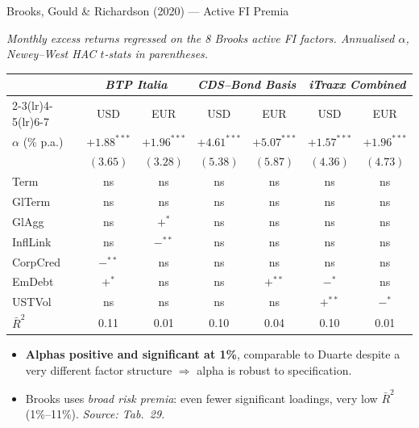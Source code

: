 \documentclass[aspectratio=169,11pt]{beamer}
\newcommand{\hlt}[1]{\textcolor{edhecred}{\textbf{#1}}}     %
\begin{document}
\begin{frame}[t]{Brooks, Gould \& Richardson (2020) --- Active FI Premia}
\centering
\scriptsize
\vspace{0.05cm}

\textit{Monthly excess returns regressed on the 8 Brooks active FI factors.
Annualised $\alpha$, Newey--West HAC $t$-stats in parentheses.}

\vspace{0.20cm}
\renewcommand{\arraystretch}{0.95}
\setlength{\tabcolsep}{4pt}

\begin{tabular}{lcccccc}
\toprule
 & \multicolumn{2}{c}{\textit{BTP Italia}}
 & \multicolumn{2}{c}{\textit{CDS--Bond Basis}}
 & \multicolumn{2}{c}{\textit{iTraxx Combined}} \\
\cmidrule(lr){2-3}\cmidrule(lr){4-5}\cmidrule(lr){6-7}
 & USD & EUR & USD & EUR & USD & EUR \\
\midrule
$\alpha$ (\% p.a.)  & \hlt{$+1.88^{***}$} & \hlt{$+1.96^{***}$}
                    & \hlt{$+4.61^{***}$} & \hlt{$+5.07^{***}$}
                    & \hlt{$+1.57^{***}$} & \hlt{$+1.96^{***}$} \\
                    & $(3.65)$ & $(3.28)$ & $(5.38)$ & $(5.87)$ & $(4.36)$ & $(4.73)$ \\
\addlinespace
Term       & ns  & ns  & ns  & ns  & ns  & ns  \\
GlTerm     & ns  & ns  & ns  & ns  & ns  & ns  \\
GlAgg      & ns  & $+^{*}$ & ns & ns & ns & ns \\
InflLink   & ns  & $-^{**}$ & ns  & ns  & ns  & ns  \\
CorpCred   & $-^{**}$ & ns & ns & ns  & ns  & ns  \\
EmDebt     & $+^{*}$ & ns & ns & $+^{**}$ & $-^{*}$ & ns \\
USTVol     & ns  & ns  & ns  & ns  & $+^{**}$ & $-^{*}$ \\
\addlinespace
$\bar R^2$ & 0.11 & 0.01 & 0.10 & 0.04 & 0.10 & 0.01 \\
\bottomrule
\end{tabular}

\vspace{0.25cm}

\begin{itemize}\itemsep=0.04cm\scriptsize
  \item \hlt{Alphas positive and significant at 1\%}, comparable to Duarte despite a
        very different factor structure $\Rightarrow$ alpha is robust to specification.
  \item Brooks uses \emph{broad risk premia}: even fewer significant loadings, very low $\bar R^2$
        (1\%--11\%). \emph{Source: Tab.\ 29.}
\end{itemize}

\end{frame}
\end{document}
